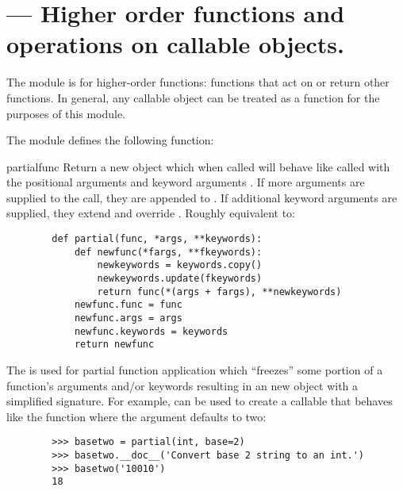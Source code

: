\section{ ---
         Higher order functions and operations on callable objects.}





The  module is for higher-order functions: functions
that act on or return other functions. In general, any callable object can
be treated as a function for the purposes of this module.


The  module defines the following function:

\begin{funcdesc}{partial}{func}
Return a new  object which when called will behave like
 called with the positional arguments  and keyword
arguments . If more arguments are supplied to the call, they
are appended to . If additional keyword arguments are supplied,
they extend and override . Roughly equivalent to:
  \begin{verbatim}
        def partial(func, *args, **keywords):
            def newfunc(*fargs, **fkeywords):
                newkeywords = keywords.copy()
                newkeywords.update(fkeywords)
                return func(*(args + fargs), **newkeywords)
            newfunc.func = func
            newfunc.args = args
            newfunc.keywords = keywords
            return newfunc
  \end{verbatim}

The  is used for partial function application which
``freezes'' some portion of a function's arguments and/or keywords
resulting in an new object with a simplified signature.  For example,
 can be used to create a callable that behaves like
the  function where the  argument defaults to
two:
  \begin{verbatim}
        >>> basetwo = partial(int, base=2)
        >>> basetwo.__doc__('Convert base 2 string to an int.')
        >>> basetwo('10010')
        18
  \end{verbatim}
\end{funcdesc}



